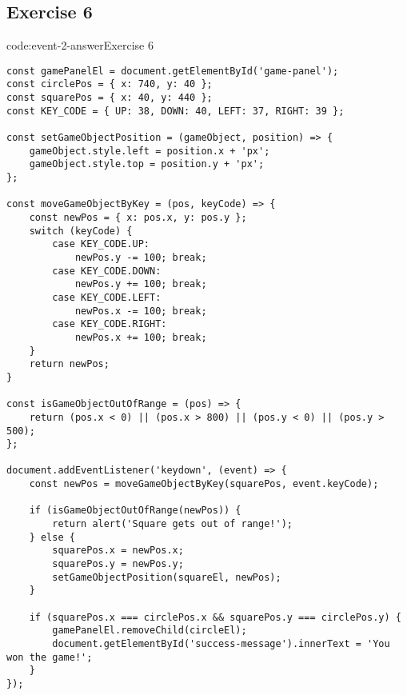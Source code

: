 \subsection*{Exercise 6}

\begin{codeenv}{code:event-2-answer}{Exercise 6}\begin{verbatim}
const gamePanelEl = document.getElementById('game-panel');
const circlePos = { x: 740, y: 40 };
const squarePos = { x: 40, y: 440 };
const KEY_CODE = { UP: 38, DOWN: 40, LEFT: 37, RIGHT: 39 };

const setGameObjectPosition = (gameObject, position) => {
    gameObject.style.left = position.x + 'px';
    gameObject.style.top = position.y + 'px';
};

const moveGameObjectByKey = (pos, keyCode) => {
    const newPos = { x: pos.x, y: pos.y };
    switch (keyCode) {
        case KEY_CODE.UP:
            newPos.y -= 100; break;
        case KEY_CODE.DOWN:
            newPos.y += 100; break;
        case KEY_CODE.LEFT:
            newPos.x -= 100; break;
        case KEY_CODE.RIGHT:
            newPos.x += 100; break;
    }
    return newPos;
}

const isGameObjectOutOfRange = (pos) => {
    return (pos.x < 0) || (pos.x > 800) || (pos.y < 0) || (pos.y > 500);
};

document.addEventListener('keydown', (event) => {
    const newPos = moveGameObjectByKey(squarePos, event.keyCode);

    if (isGameObjectOutOfRange(newPos)) {
        return alert('Square gets out of range!');
    } else {
        squarePos.x = newPos.x;
        squarePos.y = newPos.y;
        setGameObjectPosition(squareEl, newPos);
    }

    if (squarePos.x === circlePos.x && squarePos.y === circlePos.y) {
        gamePanelEl.removeChild(circleEl);
        document.getElementById('success-message').innerText = 'You won the game!';
    }
});
\end{verbatim}
\end{codeenv}
